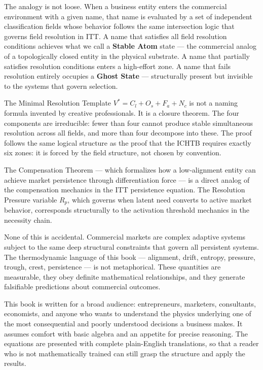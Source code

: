 \documentclass[12pt, openany]{book}
\theoremstyle{thmstyle}
\theoremstyle{defstyle}
\newcommand{\vstar}{V^{*}}
\newcommand{\Nc}{N_c}
\newcommand{\Os}{O_s}
\newcommand{\Fa}{F_a}
\newcommand{\Cl}{C_l}
\newcommand{\Rp}{R_p}
\begin{document}
\vspace{8pt}

The analogy is not loose. When a business entity enters the commercial environment with a given name, that name is evaluated by a set of independent classification fields whose behavior follows the same intersection logic that governs field resolution in ITT. A name that satisfies all field resolution conditions achieves what we call a \textbf{Stable Atom} state --- the commercial analog of a topologically closed entity in the physical substrate. A name that partially satisfies resolution conditions enters a high-effort zone. A name that fails resolution entirely occupies a \textbf{Ghost State} --- structurally present but invisible to the systems that govern selection.

The Minimal Resolution Template $\vstar = \Cl + \Os + \Fa + \Nc$ is not a naming formula invented by creative professionals. It is a closure theorem. The four components are irreducible: fewer than four cannot produce stable simultaneous resolution across all fields, and more than four decompose into these. The proof follows the same logical structure as the proof that the ICHTB requires exactly six zones: it is forced by the field structure, not chosen by convention.

\vspace{8pt}

The Compensation Theorem --- which formalizes how a low-alignment entity can achieve market persistence through differentiation force --- is a direct analog of the compensation mechanics in the ITT persistence equation. The Resolution Pressure variable $\Rp$, which governs when latent need converts to active market behavior, corresponds structurally to the activation threshold mechanics in the necessity chain.

None of this is accidental. Commercial markets are complex adaptive systems subject to the same deep structural constraints that govern all persistent systems. The thermodynamic language of this book --- alignment, drift, entropy, pressure, trough, crest, persistence --- is not metaphorical. These quantities are measurable, they obey definite mathematical relationships, and they generate falsifiable predictions about commercial outcomes.

\vspace{8pt}

This book is written for a broad audience: entrepreneurs, marketers, consultants, economists, and anyone who wants to understand the physics underlying one of the most consequential and poorly understood decisions a business makes. It assumes comfort with basic algebra and an appetite for precise reasoning. The equations are presented with complete plain-English translations, so that a reader who is not mathematically trained can still grasp the structure and apply the results.
\end{document}
